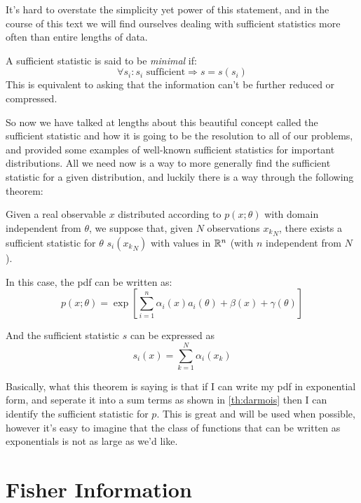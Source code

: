  It's hard to overstate the simplicity yet power of this statement, and in the course of this text we will find ourselves dealing with sufficient statistics more often than entire lengths of data. 

\begin{definition}
	A sufficient statistic is said to be \emph{minimal} if:
	\[
	\forall s_i:s_i\text{ sufficient}\Rightarrow s=s(s_i)
	\]
	This is equivalent to asking that the information can't be further reduced or compressed. 
\end{definition}

So now we have talked at lengths about this beautiful concept called the sufficient statistic and how it is going to be the resolution to all of our problems, and provided some examples of well-known sufficient statistics for important distributions. All we need now is a way to more generally find the sufficient statistic for a given distribution, and luckily there is a way through the following theorem:

\begin{theorem}
	Given a real observable $x$ distributed according to $p(x;\theta)$ with domain independent from $\theta$, we suppose that, given $N$ observations ${x_k}_N$, there exists a sufficient statistic for $\theta$ $s_i\left({x_k}_N\right)$ with values in $\mathbb{R}^n$ (with $n$ independent from $N$).
	
	In this case, the pdf can be written as:
	\[
	p(x;\theta) = \exp{\left[ \sum_{i=1}^n \alpha_i(x)a_i(\theta) + \beta(x) +\gamma(\theta)\right]}
	\]
	
	And the sufficient statistic $s$ can be expressed as
	\[
	s_i(x)=\sum_{k=1}^N \alpha_i(x_k)
	\]
\label{th:darmois}
\end{theorem}

Basically, what this theorem is saying is that if I can write my pdf in exponential form, and seperate it into a sum terms as shown in \ref{th:darmois} then I can identify the sufficient statistic for $p$. This is great and will be used when possible, however it's easy to imagine that the class of functions that can be written as exponentials is not as large as we'd like.

\section{Fisher Information}

